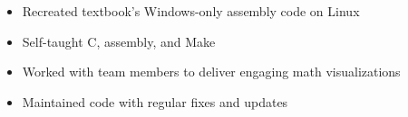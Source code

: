 \documentclass[10pt]{article}
\begin{document}

	\begin{itemize}[noitemsep]
		\item Recreated textbook's Windows-only assembly code on Linux
		\item Self-taught C, assembly, and Make
	\end{itemize}


	\begin{itemize}[noitemsep]
		\item Worked with team members to deliver engaging math visualizations
	\end{itemize}


	\begin{itemize}[noitemsep]
		\item Maintained code with regular fixes and updates
	\end{itemize}
\end{document}
